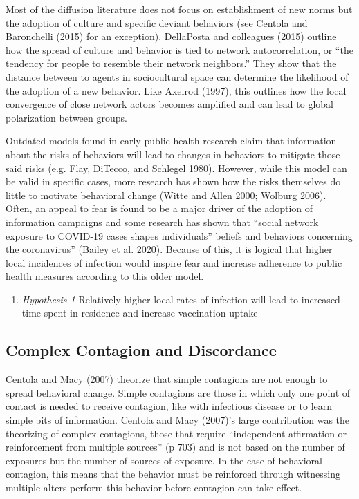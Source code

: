 Most of the diffusion literature does not focus on establishment of new norms
but the adoption of culture and specific deviant behaviors (see
Centola and Baronchelli (2015) for an exception). DellaPosta and
colleagues (2015) outline how the spread of culture
and behavior is tied to network autocorrelation, or ``the tendency for people to
resemble their network neighbors.'' They show that the distance between to agents
in sociocultural space can determine the likelihood of the adoption of a new
behavior. Like Axelrod (1997), this outlines
how the local convergence of close network actors becomes amplified and can
lead to global polarization between groups.

Outdated models found in early public health research claim that information
about the risks of behaviors will lead to changes in behaviors to mitigate those
said risks (e.g. Flay, DiTecco, and Schlegel 1980). However, while this model can be valid in specific
cases, more research has shown how the risks themselves do little to motivate
behavioral change (Witte and Allen 2000; Wolburg 2006). Often, an appeal to fear is
found to be a major driver of the adoption of information campaigns and some
research has shown that ``social network exposure to COVID-19 cases shapes
individuals'' beliefs and behaviors concerning the coronavirus''
(Bailey et al. 2020). Because of this, it is logical that higher local incidences of
infection would inspire fear and increase adherence to public health measures
according to this older model.

\begin{enumerate}
\def\labelenumi{(\arabic{enumi})}
\tightlist
\item
  \emph{Hypothesis 1} Relatively higher local rates of infection will lead to increased time spent in residence and increase vaccination uptake
\end{enumerate}

\hypertarget{complex-contagion-and-discordance}{%
\subsection{Complex Contagion and Discordance}\label{complex-contagion-and-discordance}}

Centola and Macy (2007) theorize that simple contagions are not
enough to spread behavioral change. Simple contagions are those in which only
one point of contact is needed to receive contagion, like with infectious
disease or to learn simple bits of information.
Centola and Macy (2007)'s large contribution was the theorizing
of complex contagions, those that require ``independent affirmation or
reinforcement from multiple sources'' (p 703) and is not based on the number of
exposures but the number of sources of exposure. In the case of behavioral
contagion, this means that the behavior must be reinforced through witnessing
multiple alters perform this behavior before contagion can take effect.

